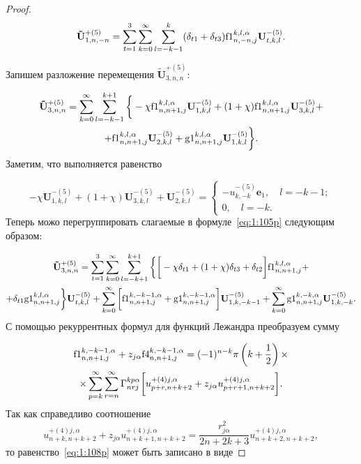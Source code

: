 \begin{proof}
\begin{equation}
\mathbf{\tilde U}_{1,n,-n}^{+(5)}=\sum\limits_{t=1}^3\sum\limits_{k=0}^\infty\sum\limits_{l=-k-1}^{k}(\delta_{t1}+\delta_{t3}){\rm f1}_{n,-n,j}^{k,l,\alpha}\mathbf{U}_{t,k,l}^{-(5)}.
\label{eq:1:104p}
\end{equation}

Запишем разложение перемещения $\mathbf{\tilde U}_{3,n,n}^{+(5)}$:

\begin{multline}\label{eq:1:105p}
\mathbf{\tilde U}_{3,n,n}^{+(5)}=\sum\limits_{k=0}^\infty\sum\limits_{l=-k-1}^{k+1}\bigg\{-\chi{\rm f1}_{n,n+1,j}^{k,l,\alpha}\mathbf{U}_{1,k,l}^{-(5)}+(1+\chi){\rm f1}_{n,n+1,j}^{k,l,\alpha}\mathbf{U}_{3,k,l}^{-(5)}+ \\
+{\rm f1}_{n,n+1,j}^{k,l,\alpha}\mathbf{U}_{2,k,l}^{-(5)}+{\rm g1}_{n,n+1,j}^{k,l,\alpha}\mathbf{U}_{1,k,l}^{-(5)}\bigg\}.
\end{multline}
Заметим, что выполняется равенство

\begin{equation}
-\chi\mathbf{U}_{1,k,l}^{-(5)}+(1+\chi)\mathbf{U}_{3,k,l}^{-(5)}+\mathbf{U}_{2,k,l}^{-(5)}=
\begin{cases}
-u_{k,-k}^{-(5)}\mathbf{e}_1,\quad l=-k-1; \\
0,\quad l=-k.
\end{cases}
\label{eq:1:106p}
\end{equation}
Теперь можо перегруппировать слагаемые в формуле~\eqref{eq:1:105p} следующим образом:

\begin{multline}\label{eq:1:107p}
\mathbf{\tilde U}_{3,n,n}^{+(5)}=\sum\limits_{t=1}^3\sum\limits_{k=0}^\infty\sum\limits_{l=-k+1}^{k+1}\bigg\{\bigg\lbrack-\chi\delta_{t1}+(1+\chi)\delta_{t3}+\delta_{t2}\bigg\rbrack{\rm f1}_{n,n+1,j}^{k,l,\alpha}+ \\
+\delta_{t1}{\rm g1}_{n,n+1,j}^{k,l,\alpha}\bigg\}\mathbf{U}_{t,k,l}^{-(5)}+\sum\limits_{k=0}^\infty\bigg\lbrack{\rm f1}_{n,n+1,j}^{k,-k-1,\alpha}+{\rm g1}_{n,n+1,j}^{k,-k-1,\alpha}\bigg\rbrack\mathbf{U}_{1,k,-k-1}^{-(5)}+\sum\limits_{k=0}^\infty{\rm g1}_{n,n+1,j}^{k,-k,\alpha}\mathbf{U}_{1,k,-k}^{-(5)}.
\end{multline}
С помощью рекуррентных формул для функций Лежандра преобразуем сумму

\begin{multline}
{\rm f1}_{n,n+1,j}^{k,-k-1,\alpha}+z_{j\alpha}{\rm f4}_{n,n+1,j}^{k,-k-1,\alpha}=(-1)^{n-k}\pi \left( {k + \frac{1}{2}} \right)\times \\
\times\sum\limits_{p = k}^\infty  \sum\limits_{r = n}^\infty\Gamma _{nrj}^{kp\alpha }\bigg\lbrack{u}_{p+r,n+k+2}^{+(4)j,\alpha}+z_{j\alpha}{u}_{p+r+1,n+k+2}^{ + (4)j,\alpha}\bigg\rbrack.
\label{eq:1:108p}
\end{multline}
Так как справедливо соотношение
$$
{u}_{n+k,n+k+2}^{ + (4)j,\alpha}+z_{j\alpha}{u}_{n+k+1,n+k+2}^{+(4)j,\alpha}=\frac{r_{j\alpha}^2}{2n+2k+3}u_{n+k+2,n+k+2}^{+(4)j,\alpha},
$$
то равенство~\eqref{eq:1:108p} может быть записано в виде


\end{proof}

